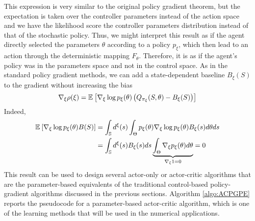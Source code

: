 This expression is very similar to the original policy gradient theorem, but
the expectation is taken over the controller parameters instead of the action space and we have the likelihood score the controller parameters distribution instead of that of the stochastic policy. Thus, we might interpret this result as if the agent directly selected the parameters $\theta$ according to a policy $p_\xi$, which then lead to an action through the deterministic mapping $F_\theta$. Therefore, it is as if the agent's policy was in the parameters space and not in the control space. As in the standard policy gradient methods, we can add a state-dependent baseline $B_\xi(S)$ to the gradient without increasing the bias
\begin{equation}
	\nabla_\xi \rho(\xi) = \mathbb{E}_{}\left[ \nabla_\xi \log p_\xi(\theta) \left(Q_{\pi_\xi}(S,
						\theta) - B_\xi(S)\right) \right]
\end{equation}
Indeed, 
\begin{equation*}
	\begin{split}
		\mathbb{E}_{}\left[ \nabla_\xi \log p_\xi(\theta) B(S) \right] 
			&= \int_{\mathbb{S}} d^\xi(s) \int_\Theta p_\xi(\theta) \nabla_\xi \log
		p_\xi(\theta) B_\xi(s) d\theta ds\\
		&= \int_{\mathbb{S}} d^\xi(s) B_\xi(s) ds \underbrace{\int_\Theta \nabla_\xi p_\xi(\theta)
	d\theta}_{\nabla_\xi 1 = 0} = 0
	\end{split}
\end{equation*}
This result can be used to design several actor-only or actor-critic algorithms that are the parameter-based equivalents of the traditional control-based policy-gradient algorithms discussed in the previous sections. Algorithm \ref{algo:ACPGPE} reports the pseudocode for a parameter-based actor-critic algorithm, which is one of the learning methods that will be used in the numerical applications. 

